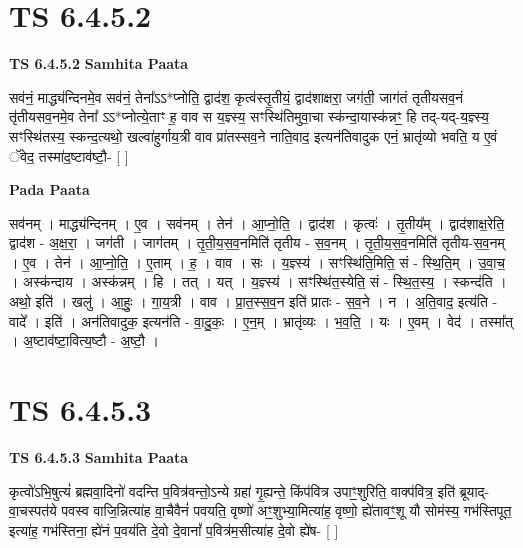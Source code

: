 \documentclass[17pt]{extarticle}
\begin{document}

\section{ TS 6.4.5.2 }

\textbf{TS 6.4.5.2 } \newline
\textbf{Samhita Paata} \newline

सव॑नं॒ माद्ध्य॑न्दिनमे॒व सव॑नं॒ तेना᳚ऽऽ*प्नोति॒ द्वाद॑श॒ कृत्व॑स्तृ॒तीयं॒ द्वाद॑शाक्षरा॒ जग॑ती॒ जाग॑तं तृतीयसव॒नं तृ॑तीयसव॒नमे॒व तेना᳚ ऽऽ*प्नोत्ये॒ताꣳ ह॒ वाव स य॒ज्ञ्स्य॒ सꣳस्थि॑तिमुवा॒चा स्क॑न्दा॒यास्क॑न्नꣳ॒॒ हि तद्-यद्-य॒ज्ञ्स्य॒ सꣳस्थि॑तस्य॒ स्कन्द॒त्यथो॒ खल्वा॑हुर्गाय॒त्री वाव प्रा॑तस्सव॒ने नाति॒वाद॒ इत्यन॑तिवादुक एनं॒ भ्रातृ॑व्यो भवति॒ य ए॒वं ॅवेद॒ तस्मा॑द॒ष्टाव॑ष्टौ॒- [  ] \newline

\textbf{Pada Paata} \newline

सव॑नम् । माद्ध्य॑न्दिनम् । ए॒व । सव॑नम् । तेन॑ । आ॒प्नो॒ति॒ । द्वाद॑श । कृत्वः॑ । तृ॒तीय᳚म् । द्वाद॑शाक्ष॒रेति॒ द्वाद॑श - अ॒क्ष॒रा॒ । जग॑ती । जाग॑तम् । तृ॒ती॒य॒स॒व॒नमिति॑ तृतीय - स॒व॒नम् । तृ॒ती॒य॒स॒व॒नमिति॑ तृतीय-स॒व॒नम् । ए॒व । तेन॑ । आ॒प्नो॒ति॒ । ए॒ताम् । ह॒ । वाव । सः । य॒ज्ञ्स्य॑ । सꣳस्थि॑ति॒मिति॒ सं - स्थि॒ति॒म् । उ॒वा॒च॒ । अस्क॑न्दाय । अस्क॑न्नम् । हि । तत् । यत् । य॒ज्ञ्स्य॑ । सꣳस्थि॑त॒स्येति॒ सं - स्थि॒त॒स्य॒ । स्कन्द॑ति । अथो॒ इति॑ । खलु॑ । आ॒हुः॒ । गा॒य॒त्री । वाव । प्रा॒त॒स्स॒व॒न इति॑ प्रातः - स॒व॒ने । न । अ॒ति॒वाद॒ इत्य॑ति - वादे᳚ । इति॑ । अन॑तिवादुक॒ इत्यन॑ति - वा॒दु॒कः॒ । ए॒न॒म् । भ्रातृ॑व्यः । भ॒व॒ति॒ । यः । ए॒वम् । वेद॑ । तस्मा᳚त् । अ॒ष्टाव॑ष्टा॒वित्य॒ष्टौ - अ॒ष्टौ॒ ।  \newline





\section{ TS 6.4.5.3 }

\textbf{TS 6.4.5.3 } \newline
\textbf{Samhita Paata} \newline

कृत्वो॑ऽभि॒षुत्यं॑ ब्रह्मवा॒दिनो॑ वदन्ति प॒वित्र॑वन्तो॒ऽन्ये ग्रहा॑ गृ॒ह्यन्ते॒ किंप॑वित्र उपाꣳ॒॒शुरिति॒ वाक्प॑वित्र॒ इति॑ ब्रूयाद्-वा॒चस्पत॑ये पवस्व वाजि॒न्नित्या॑ह वा॒चैवैनं॑ पवयति॒ वृष्णो॑ अꣳ॒॒शुभ्या॒मित्या॑ह॒ वृष्णो॒ ह्ये॑तावꣳ॒॒शू यौ सोम॑स्य॒ गभ॑स्तिपूत॒ इत्या॑ह॒ गभ॑स्तिना॒ ह्ये॑नं प॒वय॑ति दे॒वो दे॒वानां᳚ प॒वित्र॑म॒सीत्या॑ह दे॒वो ह्ये॑ष- [  ] \newline
\end{document}
